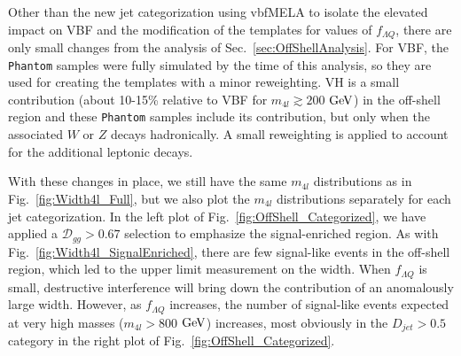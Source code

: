 Other than the new jet categorization using vbfMELA to isolate the elevated impact on VBF and the modification of the templates for values of $f_{\Lambda Q}$, there are only small changes from the analysis of Sec.~\ref{sec:OffShellAnalysis}. For VBF, the {\tt Phantom} samples were fully simulated by the time of this analysis, so they are used for creating the templates with a minor reweighting. VH is a small contribution (about 10-15\% relative to VBF for $m_{4l}\gtrsim200$ $\rm{GeV}$) in the off-shell region and these {\tt Phantom} samples include its contribution, but only when the associated $W$ or $Z$ decays hadronically. A small reweighting is applied to account for the additional leptonic decays.

With these changes in place, we still have the same $m_{4l}$ distributions as in Fig.~\ref{fig:Width4l_Full}, but we also plot the $m_{4l}$ distributions separately for each jet categorization. In the left plot of Fig.~\ref{fig:OffShell_Categorized}, we have applied a $\mathcal{D}_{gg} > 0.67$ selection to emphasize the signal-enriched region. As with Fig.~\ref{fig:Width4l_SignalEnriched}, there are few signal-like events in the off-shell region, which led to the upper limit measurement on the width. When $f_{\Lambda Q}$ is small, destructive interference will bring down the contribution of an anomalously large width. However, as $f_{\Lambda Q}$ increases, the number of signal-like events expected at very high masses ($m_{4l}>800$ $\rm{GeV}$) increases, most obviously in the $D_{jet}>0.5$ category in the right plot of Fig.~\ref{fig:OffShell_Categorized}.

